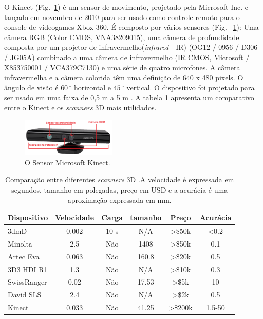 O Kinect (Fig.~\ref{fig:kinect}) é um sensor de movimento, projetado pela Microsoft Inc. e lançado em novembro de 2010 para ser usado como controle remoto para o console de videogames Xbox 360. É composto por vários sensores (Fig. ~\ref{fig:kinect}): Uma câmera RGB (Color CMOS, VNA38209015), uma câmera de profundidade composta por um projetor de infravermelho(\textit{infrared} - IR) (OG12 / 0956 / D306 / JG05A) combinado a uma câmera de infravermelho (IR CMOS, Microsoft / X853750001 / VCA379C7130) e uma série de quatro microfones. A câmera infravermelha e a câmera colorida têm uma definição de 640 x 480 pixels. O ângulo de visão é $60\,^{\circ}$ horizontal e $45\,^{\circ}$ vertical. O dispositivo foi projetado para ser usado em uma faixa de 0,5 m a 5 m \cite{sevrin2015characterization}. A tabela \ref{table:comparativoScanners} apresenta um comparativo entre o Kinect e os \textit{scanners} 3D mais utilidados.

 \begin{figure}[ht]
\centering
    \includegraphics[resolution=300,width=0.4\textwidth,natwidth=610,natheight=642]{images/kinect.png}
    \caption{O Sensor Microsoft Kinect.}
    \label{fig:kinect}
\end{figure}


 \begin{table}[ht]
 \caption{Comparação entre diferentes \textit{scanners} 3D \cite{li2013using}.\newline A velocidade é expressada em segundos, tamanho em polegadas, preço em USD e a acurácia é uma aproximação expressada em mm.}
 \label{table:comparativoScanners}
 \begin{tabular}{|l|c|c|c|c|c|}
\hline  
 Dispositivo & Velocidade & Carga & tamanho & Preço & Acurácia \\ \hline  
 3dmD & 0.002 & 10 s & N/A & >\$50k & <0.2 \\ \hline  
 Minolta & 2.5 & Não & 1408 & >\$50k & 0.1 \\ \hline  
 Artec Eva & 0.063 & Não & 160.8 & >\$20k & 0.5 \\ \hline  
 3D3 HDI R1 & 1.3 & Não & N/A & >\$10k & 0.3 \\ \hline  
 SwissRanger & 0.02 & Não & 17.53 & >\$5k & 10 \\ \hline  
 David SLS & 2.4 & Não & N/A & >\$2k & 0.5 \\ \hline  
 Kinect & 0.033 & Não & 41.25 & >\$200k & 1.5-50 \\ \hline
\end{tabular}
\end{table}


